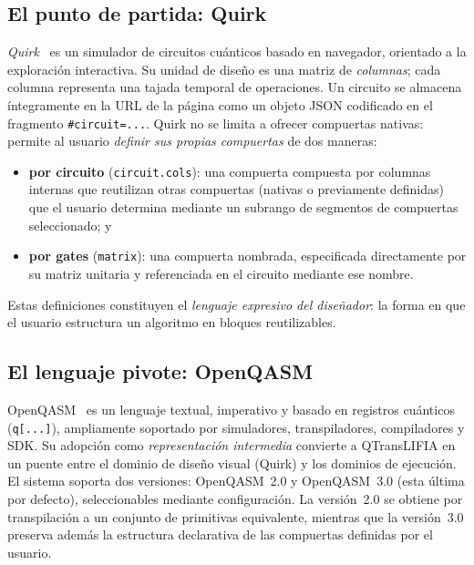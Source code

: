 \documentclass[11pt,a4paper]{article}
\newcommand{\code}[1]{\texttt{#1}}
\begin{document}
\subsection{El punto de partida: Quirk}

\emph{Quirk}~\cite{gidney2016quirk} es un simulador de circuitos cuánticos basado en
navegador, orientado a la exploración interactiva. Su unidad de diseño es una matriz de
\emph{columnas}; cada columna representa una tajada temporal de operaciones. Un circuito se
almacena íntegramente en la URL de la página como un objeto JSON codificado en el fragmento \code{\#circuit=...}. Quirk no se limita a ofrecer compuertas nativas: permite al usuario \emph{definir sus propias compuertas} de dos maneras:

\begin{itemize}[leftmargin=1.6em]
  \item \textbf{por circuito} (\code{circuit.cols}): una compuerta compuesta por columnas internas que reutilizan otras compuertas (nativas o previamente definidas) que el usuario determina mediante un subrango de segmentos de compuertas seleccionado; y
  \item \textbf{por gates} (\code{matrix}): una compuerta nombrada, especificada directamente por su matriz unitaria y referenciada en el circuito mediante ese nombre.
\end{itemize}

Estas definiciones constituyen el \emph{lenguaje expresivo del diseñador}: la forma en que
el usuario estructura un algoritmo en bloques reutilizables.

\subsection{El lenguaje pivote: OpenQASM}

OpenQASM~\cite{cross2017openqasm, openqasm3} es un lenguaje textual, imperativo y basado en
registros cuánticos (\code{q[...]}), ampliamente soportado por simuladores, transpiladores,
compiladores y SDK. Su adopción como \emph{representación intermedia} convierte a
QTransLIFIA en un puente entre el dominio de diseño visual (Quirk) y los dominios de
ejecución. El sistema soporta dos versiones: OpenQASM~2.0 y OpenQASM~3.0 (esta última por
defecto), seleccionables mediante configuración. La versión~2.0 se obtiene por
transpilación a un conjunto de primitivas equivalente, mientras que la versión~3.0
preserva además la estructura declarativa de las compuertas definidas por el usuario.
\end{document}
